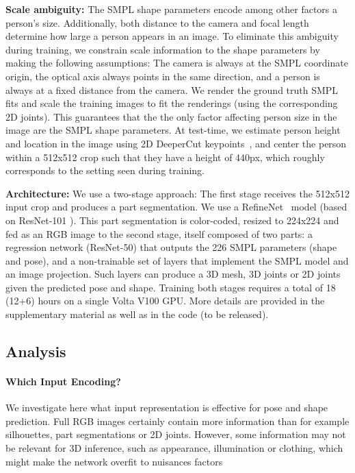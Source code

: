 \documentclass[10pt,twocolumn,letterpaper]{article}
\begin{document}
\textbf{Scale ambiguity:} The SMPL shape parameters encode among other factors a person's size. 
Additionally, both distance to the camera and focal length determine how large a person appears in an image.
To eliminate this ambiguity during training, we constrain scale information to the shape parameters by making the following 
assumptions: The camera is always at the SMPL coordinate origin, the optical axis always points in the same direction, and a person
is always at a fixed distance from the camera. We render the ground truth SMPL fits and scale the training images to fit the renderings (using the corresponding 2D joints). 
This guarantees that the the only factor affecting person size in the image are the SMPL shape parameters. At test-time, 
we estimate person height and location in the image using 2D DeeperCut keypoints~\cite{insafutdinov_deepercut_eccv16},
and center the person within a 512x512 crop such that they have a height of 440px, which roughly corresponds to the setting seen during training.

\textbf{Architecture:} We use a two-stage approach: The first stage receives the 512x512 input crop and produces a part
segmentation. We use a RefineNet~\cite{lin17refinenet} model (based on ResNet-101 \cite{he_resnet_cvpr2016}). 
This part segmentation is color-coded, resized to 224x224 and fed as an RGB image to the second stage, 
itself composed of two parts: a regression network (ResNet-50) that outputs the 226 SMPL parameters (shape and pose), 
and a non-trainable set of layers that implement the SMPL model and an image projection. Such layers can produce a 3D mesh, 3D joints or 2D joints
given the predicted pose and shape. Training both stages requires a total of 18 (12+6) hours on a single Volta V100 GPU.
More details are provided in the supplementary material as well as in the code (to be released). 

\subsection{Analysis}

\paragraph{\textbf{Which Input Encoding?}}

We investigate here what input representation is effective for pose and shape prediction. 
Full RGB images certainly contain more information than for example silhouettes, part segmentations or 2D joints. 
However, some information may not be relevant for 3D inference, such as appearance, illumination or clothing, 
which might make the network overfit to nuisances factors 
\end{document}
